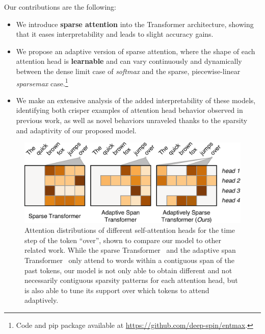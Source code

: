 Our contributions are the following:

\begin{itemize}
    \item We introduce \textbf{sparse attention} into the
          Transformer architecture, showing that it eases
          interpretability and leads to slight accuracy gains.
    \item We propose an adaptive version of sparse attention,
          where the shape of each attention head is {\bf learnable} and can vary continuously and
          dynamically between the dense limit case of \emph{softmax} and the sparse,
          piecewise-linear \emph{sparsemax} case.\footnote{
              Code and pip package available at \url{https://github.com/deep-spin/entmax}.}
    \item We make an extensive analysis of the added interpretability of these
          models, identifying both crisper examples of attention head behavior observed in
          previous work, as well as novel behaviors unraveled thanks to the sparsity
          and adaptivity of our proposed model.
\end{itemize}

\begin{figure}[htbp]
    \centering
    \includegraphics[width=0.95\columnwidth]{Figures/comparison.pdf}
    \caption{Attention distributions of different self-attention heads for the
        time step of the token ``over'', shown to compare our model to other
        related work. While the sparse
        Transformer~\citep{openai_sparse_transf} and the adaptive span
        Transformer~\citep{Sukhbaatar2019} only attend to words within a
        contiguous span of the past tokens, our model is not only able to
        obtain different and not necessarily contiguous sparsity patterns for
        each attention head, but is also able to tune its support over which
        tokens to attend adaptively.}
    \label{fig:comparison}
\end{figure}


